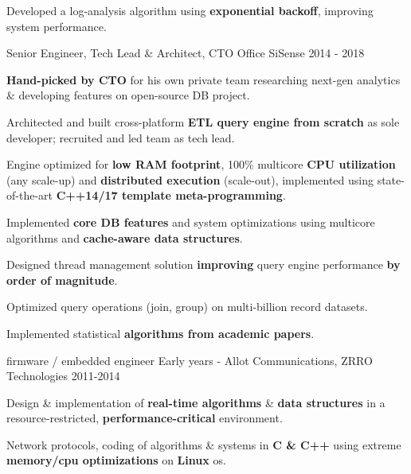 \begin{cventries}
{\begin{cvitems}
        \item {Developed a log-analysis algorithm using \textbf{exponential backoff}, improving system performance.}
      \end{cvitems}
    }
  \cventry
    {Senior Engineer, Tech Lead \& Architect, CTO Office}
    {SiSense}
    {}
    {2014 - 2018}
    {
      \begin{cvitems}
        \item {\textbf{Hand-picked by CTO} for his own private team researching next-gen analytics \& developing features on open-source DB project.}
        \item {Architected and built cross-platform \textbf{ETL query engine from scratch} as sole developer; recruited and led team as tech lead.}
        \item {Engine optimized for \textbf{low RAM footprint}, 100\% multicore \textbf{CPU utilization} (any scale-up) and \textbf{distributed execution} (scale-out), implemented using state-of-the-art \textbf{C++14/17 template meta-programming}.}
        \item {Implemented \textbf{core DB features} and system optimizations using multicore algorithms and \textbf{cache-aware data structures}.}
        \item {Designed thread management solution \textbf{improving} query engine performance \textbf{by order of magnitude}.}
        \item {Optimized query operations (join, group) on multi-billion record datasets.}
        \item {Implemented statistical \textbf{algorithms from academic papers}.}
      \end{cvitems}
    }
  \cventry
    {firmware / embedded engineer}
    {Early years - Allot Communications, ZRRO Technologies}
    {}
    {2011-2014}
    {
      \begin{cvitems}
        \item {Design \& implementation of \textbf{real-time algorithms} \& \textbf{data structures} in a resource-restricted, \textbf{performance-critical} environment.}
		\item {Network protocols, coding of algorithms \& systems in \textbf{C \& C++} using extreme \textbf{memory/cpu optimizations} on \textbf{Linux} os.}
      \end{cvitems}
    }

\end{cventries}
